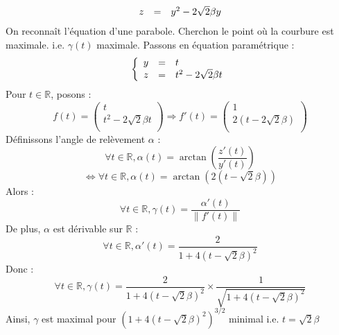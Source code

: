 \begin{enumerate}
\begin{enumerate}
\[\begin{array}{r c l}
                    z & = & y^{2} - 2\sqrt{2}\beta y \\
                  \end{array}
                \]
                On reconnaît l'équation d'une parabole.
                Cherchon le point où la courbure est maximale. i.e. $\gamma(t)$ maximale. Passons en équation paramétrique :
                \[
                  \left\{
                  \begin{array}{r c l}
                    y & = & t                        \\
                    z & = & t^{2} - 2\sqrt{2}\beta t \\
                  \end{array}
                  \right.
                \]
                Pour $t\in\mathbb{R}$, posons :
                \[
                  f(t) =
                  \left(
                  \begin{array}{c}
                      t                        \\
                      t^{2} - 2\sqrt{2}\beta t \\
                    \end{array}
                  \right)
                  \Rightarrow
                  f'(t) =
                  \left(
                  \begin{array}{c}
                      1                     \\
                      2(t - 2\sqrt{2}\beta) \\
                    \end{array}
                  \right)
                \]
                Définissons l'angle de relèvement $\alpha$ : \[\forall t\in\mathbb{R}, \alpha(t) = \arctan{(\frac{z'(t)}{y'(t)})}\]
                \[\iff\forall t\in\mathbb{R}, \alpha(t) = \arctan{(2(t-\sqrt{2}\beta))}\]
                Alors :
                \[
                  \forall t\in\mathbb{R},\gamma(t) = \frac{\alpha'(t)}{\left\|f'(t)\right\|}
                \]
                De plus, $\alpha$ est dérivable sur $\mathbb{R}$ :
                \[\forall t\in\mathbb{R}, \alpha'(t) = \frac{2}{1+4(t-\sqrt{2}\beta)^{2}}\]
                Donc :
                \[\forall t\in\mathbb{R}, \gamma(t) = \frac{2}{1+4(t-\sqrt{2}\beta)^{2}}\times \frac{1}{\sqrt{1+4(t-\sqrt{2}\beta)^{2}}}\]
                Ainsi, $\gamma$ est maximal pour $(1+4(t-\sqrt{2}\beta)^{2})^{3/2}$ minimal i.e. $t=\sqrt{2}\beta$


\end{enumerate}
\end{enumerate}
